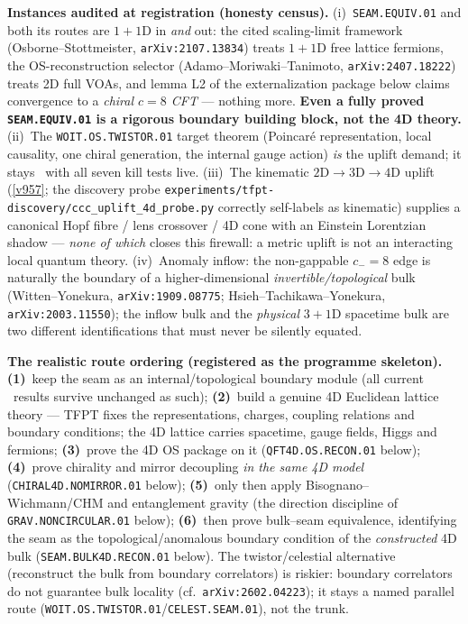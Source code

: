 \par\smallskip\noindent\textbf{Instances audited at registration (honesty census).}
(i)~\texttt{SEAM.EQUIV.01} and both its routes are $1{+}1$D in \emph{and} out: the cited
scaling-limit framework (Osborne--Stottmeister, \texttt{arXiv:2107.13834}) treats $1{+}1$D free
lattice fermions, the OS-reconstruction selector (Adamo--Moriwaki--Tanimoto,
\texttt{arXiv:2407.18222}) treats 2D full VOAs, and lemma L2 of the externalization package
below claims convergence to a \emph{chiral $c{=}8$ CFT} --- nothing more.  \textbf{Even a fully
proved \texttt{SEAM.EQUIV.01} is a rigorous boundary building block, not the 4D theory.}
(ii)~The \texttt{WOIT.OS.TWISTOR.01} target theorem (Poincar\'e representation, local causality,
one chiral generation, the internal gauge action) \emph{is} the uplift demand; it stays \mO\ with
all seven kill tests live.
(iii)~The kinematic $2\mathrm D\to3\mathrm D\to4\mathrm D$ uplift (\vref{v957}; the discovery
probe \texttt{experiments/tfpt-discovery/ccc\_uplift\_4d\_probe.py} correctly self-labels as
kinematic) supplies a canonical Hopf fibre / lens crossover / 4D cone with an Einstein Lorentzian
shadow --- \emph{none of which} closes this firewall: a metric uplift is not an interacting local
quantum theory.
(iv)~Anomaly inflow: the non-gappable $c_-{=}8$ edge is naturally the boundary of a
higher-dimensional \emph{invertible/topological} bulk (Witten--Yonekura,
\texttt{arXiv:1909.08775}; Hsieh--Tachikawa--Yonekura, \texttt{arXiv:2003.11550}); the inflow
bulk and the \emph{physical} $3{+}1$D spacetime bulk are two different identifications that must
never be silently equated.

\par\smallskip\noindent\textbf{The realistic route ordering (registered as the programme
skeleton).}
\textbf{(1)}~keep the seam as an internal/topological boundary module (all current \mE\ results
survive unchanged as such);
\textbf{(2)}~build a genuine 4D Euclidean lattice theory --- TFPT fixes the representations,
charges, coupling relations and boundary conditions; the 4D lattice carries spacetime, gauge
fields, Higgs and fermions;
\textbf{(3)}~prove the 4D OS package on it (\texttt{QFT4D.OS.RECON.01} below);
\textbf{(4)}~prove chirality and mirror decoupling \emph{in the same 4D model}
(\texttt{CHIRAL4D.NOMIRROR.01} below);
\textbf{(5)}~only then apply Bisognano--Wichmann/CHM and entanglement gravity (the direction
discipline of \texttt{GRAV.NONCIRCULAR.01} below);
\textbf{(6)}~then prove bulk--seam equivalence, identifying the seam as the topological/anomalous
boundary condition of the \emph{constructed} 4D bulk (\texttt{SEAM.BULK4D.RECON.01} below).
The twistor/celestial alternative (reconstruct the bulk from boundary correlators) is riskier:
boundary correlators do not guarantee bulk locality (cf.\ \texttt{arXiv:2602.04223}); it stays a
named parallel route (\texttt{WOIT.OS.TWISTOR.01}/\texttt{CELEST.SEAM.01}), not the trunk.

